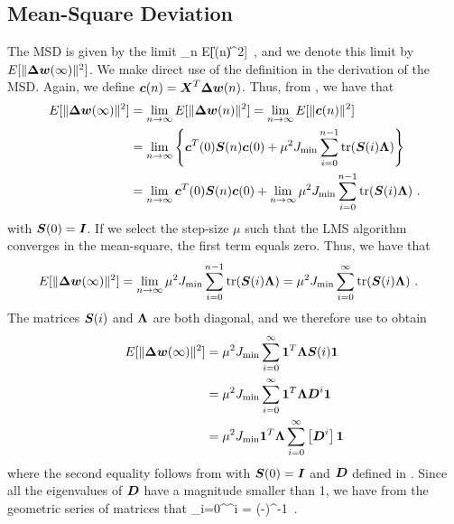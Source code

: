 \subsection{Mean-Square Deviation}
The MSD is given by the limit
\bmath
  \qquad  \lim_{n\to\infty} E[\|(n)\|^2]\ ,
\emath
and we denote this limit by $E[\|\boldsymbol{\Delta w}(\infty)\|^2]$. We make direct use of the definition in the derivation of the MSD. Again, we define $\boldsymbol{c}(n)= \boldsymbol{X}^T\boldsymbol{\Delta}\boldsymbol{w}(n)$. Thus, from , we have that
\begin{align}
  E[\|\boldsymbol{\Delta w}(\infty)\|^2] &= \lim_{n\to\infty} E[\|\boldsymbol{\Delta w}(n)\|^2] = \lim_{n\to\infty} E[\|\boldsymbol{c}(n)\|^2]\\
  &= \lim_{n\to\infty} \left\{\boldsymbol{c}^T(0)\boldsymbol{S}(n)\boldsymbol{c}(0)+\mu^2J_\textup{min}\sum_{i=0}^{n-1}\textup{tr}(\boldsymbol{S}(i)\boldsymbol{\Lambda})\right\}\\
  &= \lim_{n\to\infty} \boldsymbol{c}^T(0)\boldsymbol{S}(n)\boldsymbol{c}(0) + \lim_{n\to\infty} \mu^2J_\textup{min}\sum_{i=0}^{n-1}\textup{tr}(\boldsymbol{S}(i)\boldsymbol{\Lambda})\ .
\end{align}
with $\boldsymbol{S}(0)=\boldsymbol{I}$. If we select the step-size $\mu$ such that the LMS algorithm converges in the mean-square, the first term equals zero. Thus, we have that
\begin{align}
  E[\|\boldsymbol{\Delta w}(\infty)\|^2] &= \lim_{n\to\infty} \mu^2J_\textup{min}\sum_{i=0}^{n-1}\textup{tr}(\boldsymbol{S}(i)\boldsymbol{\Lambda}) = \mu^2J_\textup{min}\sum_{i=0}^{\infty}\textup{tr}(\boldsymbol{S}(i)\boldsymbol{\Lambda})\ .
\end{align}
The matrices $\boldsymbol{S}(i)$ and $\boldsymbol{\Lambda}$ are both diagonal, and we therefore use  to obtain
\begin{align}
  E[\|\boldsymbol{\Delta w}(\infty)\|^2] &= \mu^2J_\textup{min}\sum_{i=0}^{\infty}\boldsymbol{1}^T\boldsymbol{\Lambda}\boldsymbol{S}(i)\boldsymbol{1}\\
  &= \mu^2J_\textup{min}\sum_{i=0}^{\infty}\boldsymbol{1}^T\boldsymbol{\Lambda}\boldsymbol{D}^i\boldsymbol{1}\\
  &= \mu^2J_\textup{min}\boldsymbol{1}^T\boldsymbol{\Lambda}\sum_{i=0}^{\infty}\left[\boldsymbol{D}^i\right]\boldsymbol{1}
\end{align}
where the second equality follows from  with  $\boldsymbol{S}(0)=\boldsymbol{I}$ and $\boldsymbol{D}$ defined in . Since all the eigenvalues of $\boldsymbol{D}$ have a magnitude smaller than 1, we have from the geometric series of matrices that \cite[p.~58]{Petersen2008}
\bmath
  \sum_{i=0}^{\infty}^i = (-)^{-1}\ .
